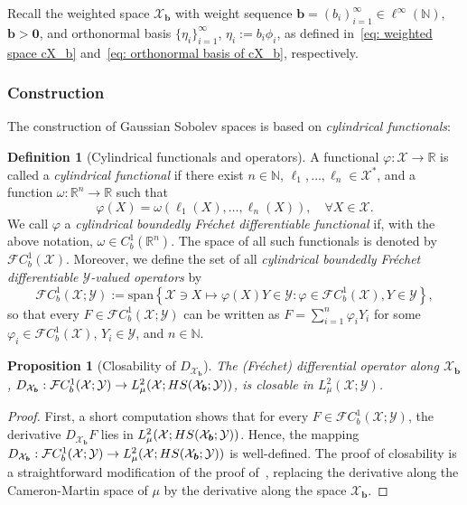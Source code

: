 \documentclass[namedate,webpdf]{ima-authoring-template-blank}
\newcommand*{\spn}{\mathrm{span}}
\newcommand*{\HS}{\textup{HS}}
\newcounter{counter}
\numberwithin{counter}{section}
\numberwithin{equation}{section}
\theoremstyle{plain}
\newtheorem{proposition}[counter]{Proposition}
\theoremstyle{definition}
\newtheorem{definition}[counter]{Definition}
\newcommand*{\cF}{\mathcal{F}}
\newcommand*{\cX}{\mathcal{X}}
\newcommand*{\cY}{\mathcal{Y}}
\newcommand*{\bbN}{\mathbb{N}}
\newcommand*{\bbR}{\mathbb{R}}
\theoremstyle{thmstyletwo}
\begin{document}
Recall the weighted space \(\cX_{\bm{b}}\) with weight sequence \(\bm{b} = (b_i)_{i=1}^{\infty} \in \ell^{\infty}(\bbN)\), \( \bm{b} > \bm{0}\), and orthonormal basis \(\{\eta_i\}_{i=1}^{\infty}\), \(\eta_i := b_i \phi_i\), as defined in~\eqref{eq: weighted space cX_b} and~\eqref{eq: orthonormal basis of cX_b}, respectively.

\subsubsection{Construction}

The construction of Gaussian Sobolev spaces is based on \emph{cylindrical functionals}:

\begin{definition}[Cylindrical functionals and operators]
    A functional \(\varphi: \cX \to \bbR\) is called a \emph{cylindrical functional} if there exist \(n\in\bbN\), \(\ell_1, \dots,\ell_n \in \cX^*\), and a function \(\omega: \bbR^n \to \bbR\) such that
    \[
    \varphi(X) = \omega(\ell_1(X), \dots, \ell_n(X)), \quad \forall X \in \cX.
    \]
    We call \(\varphi\) a \emph{cylindrical boundedly Fréchet differentiable functional} if, with the above notation, \(\omega \in C_b^1(\bbR^n)\). The space of all such functionals is denoted by \(\cF C_b^1(\cX)\).
    Moreover, we define the set of all \emph{cylindrical boundedly Fréchet differentiable \(\cY\)-valued operators} by 
    \[
    \cF C_b^1(\cX; \cY) := \spn\left\{\cX \ni X \mapsto \varphi(X) Y \in \cY: \varphi \in \cF C_b^1(\cX), Y \in \cY\right\},
    \]
    so that every \(F \in \cF C_b^1(\cX; \cY)\) can be written as
    \(
    F = \sum_{i = 1}^n \varphi_i Y_i
    \)
    for some \(\varphi_i \in \cF C_b^1(\cX)\), \(Y_i \in \cY\), and \(n \in \bbN\).
\end{definition}

\begin{proposition}[Closability of \(D_{\cX_{\bm{b}}}\)]
\label{prop: closability of differential operator}
    The (Fréchet) differential operator along \(\cX_{\bm{b}}\), \(D_{\cX_{\bm{b}}}: \cF C_b^1(\cX;\cY) \to L_{\mu}^2(\cX; \HS(\cX_{\bm{b}}; \cY))\), is closable in \(L_{\mu}^2(\cX; \cY)\). 
\end{proposition}

\begin{proof}
    First, a short computation shows that for every \(F \in \cF C_b^1(\cX; \cY)\), the derivative \(D_{\cX_{\bm{b}}} F\) lies in \(L_{\mu}^2(\cX; \HS(\cX_{\bm{b}}; \cY))\). Hence, the mapping \(D_{\cX_{\bm{b}}}: \cF C_b^1(\cX;\cY) \to L_{\mu}^2(\cX; \HS(\cX_{\bm{b}}; \cY))\) is well-defined.
    The proof of closability is a straightforward modification of the proof of~\citet[Lem. 10.2.4]{lunardi_InfiniteDimensionalAnalysis_2015}, replacing the derivative along the Cameron-Martin space of \( \mu \) by the derivative along the space \(\cX_{\bm{b}}\).
\end{proof}
\end{document}
